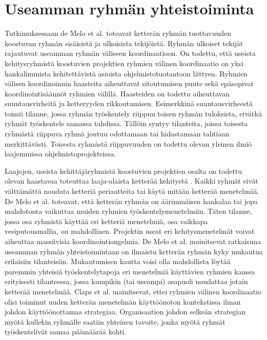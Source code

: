 \section{Useamman ryhmän yhteistoiminta}

Tutkimuksessaan de Melo et al. \cite{DEOMELO2013412} toteavat ketterän ryhmän tuottavuuden koostuvan ryhmän sisäisistä ja ulkoisista tekijöistä. Ryhmän ulkoiset tekijät rajautuvat useamman ryhmän väliseen koordinaatioon. On todettu, että useista kehitysryhmistä koostuvien projektien ryhmien välinen koordinaatio on yksi hankalimmista kehitettävistä asioista ohjelmistotuotantoon liittyen. Ryhmien välisen koordinoinnin haasteita aiheuttavat sitoutumisen puute sekä epäsopivat koordinointisäännöt ryhmien välillä. Haasteiden on todettu aiheuttavan suuntausvirheitä ja ketteryyden rikkoutumisen. Esimerkkinä suuntausvirheestä toimii tilanne, jossa ryhmän työskentely riippuu toisen ryhmän tuloksista, eivätkä ryhmät työskentele samassa tahdissa. Tällöin syntyy tilanteita, joissa toisesta ryhmästä riippuva ryhmä joutuu odottamaan tai hidastamaan tahtiaan merkittävästi. Toisesta ryhmästä riippuvuuden on todettu olevan yleinen ilmiö laajemmissa ohjelmistoprojekteissa.

Laajojen, useista kehittäjäryhmistä koostuvien projektien osalta on todettu olevan haastavaa toteuttaa laaja-alaista ketterää kehitystä \cite{DEOMELO2013412}. Kaikki ryhmät eivät välttämättä noudata ketteriä periaatteita tai käytä mitään ketterää menetelmää. De Melo et al. \cite{DEOMELO2013412} toteavat, että ketterän ryhmän on äärimmäisen hankalaa tai jopa mahdotonta vaikuttaa muiden ryhmien työskentelymenetelmiin. Täten tilanne, jossa osa ryhmistä käyttää eri ketteriä menetelmiä, osa vaikkapa vesiputousmallia, on mahdollinen. Projektin useat eri kehitysmenetelmät voivat aiheuttaa massiivisia koordinointiongelmia. De Melo et al. mainitsevat ratkaisuna useamman ryhmän yhteistoimintaan on ilmaistu ketterän ryhmän kyky mukautua erilaisiin tilanteisiin. Mukautumisen kautta voisi olla mahdollista löytää paremmin yhteisiä työskentelytapoja eri menetelmiä käyttävien ryhmien kanssa erityisesti tilanteessa, jossa kumpikin (tai useampi) osapuoli noudattaa jotain ketterää menetelmää. Claps et al. \cite{CLAPS201521} mainitsevat, ettei ryhmien välinen koordinaatio olisi toiminut uuden ketterän menetelmän käyttöönoton kontekstissa ilman johdon käyttöönottamaa strategiaa. Organisaation johdon selkeän strategian myötä kullekin ryhmälle saatiin yhteinen tavoite, jonka myötä ryhmät työskentelivät samaa päämäärää kohti.

